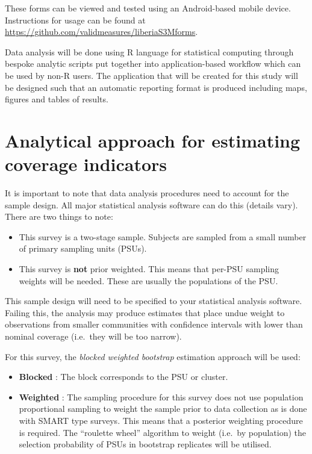 \documentclass[12pt,a4paper]{book}
\providecommand{\tightlist}{%
  \setlength{\itemsep}{0pt}\setlength{\parskip}{0pt}}
\theoremstyle{definition}
\theoremstyle{definition}
\theoremstyle{definition}
\theoremstyle{remark}
\begin{document}
These forms can be viewed and tested using an Android-based mobile
device. Instructions for usage can be found at
\url{https://github.com/validmeasures/liberiaS3Mforms}.

Data analysis will be done using R language for statistical computing
\citep{R:2018} through bespoke analytic scripts put together into
application-based workflow which can be used by non-R users. The
application that will be created for this study will be designed such
that an automatic reporting format is produced including maps, figures
and tables of results.

\hypertarget{analytical-approach-for-estimating-coverage-indicators}{%
\section{Analytical approach for estimating coverage
indicators}\label{analytical-approach-for-estimating-coverage-indicators}}

It is important to note that data analysis procedures need to account
for the sample design. All major statistical analysis software can do
this (details vary). There are two things to note:

\begin{itemize}
\tightlist
\item
  This survey is a two-stage sample. Subjects are sampled from a small
  number of primary sampling units (PSUs).
\item
  This survey is \textbf{not} prior weighted. This means that per-PSU
  sampling weights will be needed. These are usually the populations of
  the PSU.
\end{itemize}

This sample design will need to be specified to your statistical
analysis software. Failing this, the analysis may produce estimates that
place undue weight to observations from smaller communities with
confidence intervals with lower than nominal coverage (i.e.~they will be
too narrow).

For this survey, the \emph{blocked weighted bootstrap} estimation
approach will be used:

\begin{itemize}
\tightlist
\item
  \textbf{Blocked} : The block corresponds to the PSU or cluster.
\item
  \textbf{Weighted} : The sampling procedure for this survey does not
  use population proportional sampling to weight the sample prior to
  data collection as is done with SMART type surveys. This means that a
  posterior weighting procedure is required. The ``roulette wheel''
  algorithm to weight (i.e.~by population) the selection probability of
  PSUs in bootstrap replicates will be utilised.
\end{itemize}
\end{document}
